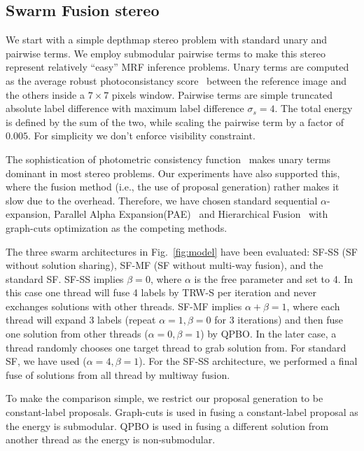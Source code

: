 \subsection{Swarm Fusion stereo}
We start with a simple depthmap stereo problem with standard unary and
pairwise terms. We employ submodular pairwise terms to make this
stereo represent relatively ``easy'' MRF inference problems.
%
Unary terms are computed as the average robust photoconsistancy
score~\cite{second_order_stereo} between the reference image and the others
inside a $7\times 7$ pixels window.  Pairwise terms are simple
truncated absolute label difference with maximum label difference
$\sigma_s=4$. The total energy is defined by the sum of the two, while
scaling the pairwise term by a factor of $0.005$. For simplicity we
don't enforce visibility constraint.

%


\noindent The sophistication of photometric consistency
function~\cite{mvs_furukawa_survey} makes unary terms dominant in most
stereo problems.  Our experiments have also supported this, where the
fusion method (i.e., the use of proposal generation) rather makes it
slow due to the overhead. Therefore, we have chosen standard sequential
$\alpha$-expansion, Parallel Alpha Expansion(PAE)~\cite{delong} and
Hierarchical Fusion~\cite{delong_hierarchical_fusion,olga_hierarchical_alpha_expansion} with graph-cuts optimization as
the competing methods.




\noindent The three swarm architectures in Fig.~\ref{fig:model} have
been evaluated: SF-SS (SF without solution sharing), SF-MF (SF without
multi-way fusion), and the standard SF.
%
SF-SS implies $\beta=0$, where $\alpha$ is the free parameter and set
to 4. In this case one thread will fuse 4 labels by TRW-S per
iteration and never exchanges solutions with other threads. SF-MF
implies $\alpha+\beta=1$, where each thread will expand 3 labels
(repeat $\alpha=1, \beta=0$ for 3 iterations) and then fuse one
solution from other threads ($\alpha=0, \beta=1$) by QPBO. In the later
case, a thread randomly chooses one target thread to grab solution
from. For standard SF, we have used ($\alpha=4, \beta=1$). For the
SF-SS architecture, we performed a final fuse of solutions from all
thread by multiway fusion.

%
%
%
%
To make the comparison simple, we restrict our proposal generation to
be constant-label proposals. Graph-cuts is used in fusing a
constant-label proposal as the energy is submodular. QPBO is used in
fusing a different solution from another thread as the energy is
non-submodular.
%

